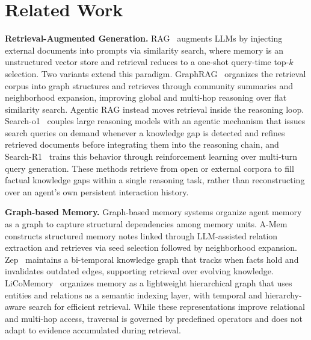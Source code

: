 \section{Related Work}
\textbf{Retrieval-Augmented Generation.}
RAG~\cite{DBLP:conf/nips/LewisPPPKGKLYR020} augments LLMs by injecting external
documents into prompts via similarity search, where memory is an unstructured
vector store and retrieval reduces to a one-shot query-time top-$k$ selection.
Two variants extend this paradigm. GraphRAG~\citep{graphrag} organizes the
retrieval corpus into graph structures and retrieves through community summaries
and neighborhood expansion, improving global and multi-hop reasoning over flat
similarity search. Agentic RAG instead moves retrieval inside the reasoning
loop. Search-o1~\cite{li2025searcho1} couples large reasoning models with an
agentic mechanism that issues search queries on demand whenever a knowledge gap
is detected and refines retrieved documents before integrating them into the
reasoning chain, and Search-R1~\cite{jin2025searchr1} trains this behavior
through reinforcement learning over multi-turn query generation. These methods
retrieve from open or external corpora to fill factual knowledge gaps within a
single reasoning task, rather than reconstructing over an agent's own persistent
interaction history.

\textbf{Graph-based Memory.}
Graph-based memory systems organize agent memory as a graph to capture
structural dependencies among memory units. A-Mem~\cite{DBLP:journals/corr/abs-2502-12110}
constructs structured memory notes linked through LLM-assisted relation
extraction and retrieves via seed selection followed by neighborhood expansion.
Zep~\cite{DBLP:journals/corr/abs-2501-13956} maintains a bi-temporal knowledge
graph that tracks when facts hold and invalidates outdated edges, supporting
retrieval over evolving knowledge. LiCoMemory~\cite{DBLP:journals/corr/abs-2511-01448}
organizes memory as a lightweight hierarchical graph that uses entities and
relations as a semantic indexing layer, with temporal and hierarchy-aware search
for efficient retrieval. While these representations improve relational and
multi-hop access, traversal is governed by predefined operators and does not
adapt to evidence accumulated during retrieval.

